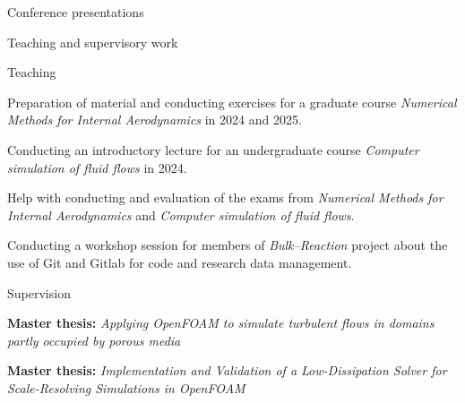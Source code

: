 \documentclass[a4paper, 10pt]{article}
\begin{document}
{\begin{cvsection}{Conference presentations}
	\end{cvsection}
	\vspace{-1em}
}{%

	\begin{cvsection}{Teaching and supervisory work}
		\begin{entry}{Teaching}{}
			\par
			Preparation of material and conducting exercises for a graduate course
			\textit{Numerical Methods for Internal Aerodynamics} in 2024 and 2025.\par
			\vspace{0.25em}
			Conducting an introductory lecture for an undergraduate course
			\textit{Computer simulation of fluid flows} in 2024.\par
			\vspace{0.25em}
			Help with conducting and evaluation of the exams from \textit{Numerical
				Methods for Internal Aerodynamics} and \textit{Computer simulation of
				fluid flows}.\par
			\vspace{0.25em}
			Conducting a workshop session for members of \textit{Bulk--Reaction}
			project about the use of Git and Gitlab for code and
			research data management.\par
		\end{entry}
		\begin{entry}{Supervision}{}
			\par
			\textbf{Master thesis:} \textit{Applying OpenFOAM to simulate turbulent ﬂows in
				domains partly occupied by porous media}\par
			\vspace{0.25em}
			\textbf{Master thesis:} \textit{Implementation and Validation of a Low-Dissipation
				Solver for Scale-Resolving Simulations in OpenFOAM}\par

		\end{entry}


\end{cvsection}}
\end{document}
